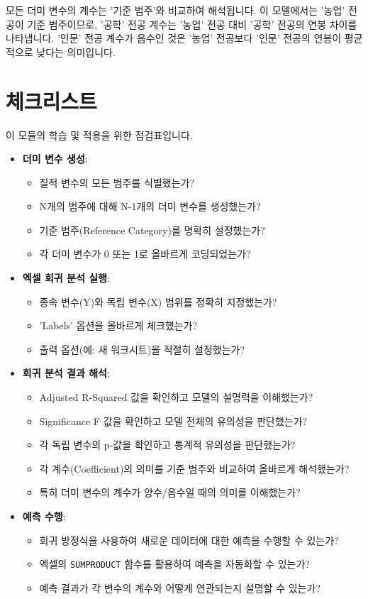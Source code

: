 \documentclass[11pt,a4paper]{book}
\theoremstyle{definition}
\begin{document}
\begin{tcolorbox}[warning={중요: 기준 범주와의 비교}]
모든 더미 변수의 계수는 '기준 범주'와 비교하여 해석됩니다. 이 모델에서는 '농업' 전공이 기준 범주이므로, '공학' 전공 계수는 '농업' 전공 대비 '공학' 전공의 연봉 차이를 나타냅니다. '인문' 전공 계수가 음수인 것은 '농업' 전공보다 '인문' 전공의 연봉이 평균적으로 낮다는 의미입니다.
\end{tcolorbox}


\section{체크리스트}

이 모듈의 학습 및 적용을 위한 점검표입니다.

\begin{itemize}
    \item \textbf{더미 변수 생성}:
    \begin{itemize}
        \item 질적 변수의 모든 범주를 식별했는가?
        \item N개의 범주에 대해 N-1개의 더미 변수를 생성했는가?
        \item 기준 범주(Reference Category)를 명확히 설정했는가?
        \item 각 더미 변수가 0 또는 1로 올바르게 코딩되었는가?
    \end{itemize}
    \item \textbf{엑셀 회귀 분석 실행}:
    \begin{itemize}
        \item 종속 변수(Y)와 독립 변수(X) 범위를 정확히 지정했는가?
        \item 'Labels' 옵션을 올바르게 체크했는가?
        \item 출력 옵션(예: 새 워크시트)을 적절히 설정했는가?
    \end{itemize}
    \item \textbf{회귀 분석 결과 해석}:
    \begin{itemize}
        \item Adjusted R-Squared 값을 확인하고 모델의 설명력을 이해했는가?
        \item Significance F 값을 확인하고 모델 전체의 유의성을 판단했는가?
        \item 각 독립 변수의 p-값을 확인하고 통계적 유의성을 판단했는가?
        \item 각 계수(Coefficient)의 의미를 기준 범주와 비교하여 올바르게 해석했는가?
        \item 특히 더미 변수의 계수가 양수/음수일 때의 의미를 이해했는가?
    \end{itemize}
    \item \textbf{예측 수행}:
    \begin{itemize}
        \item 회귀 방정식을 사용하여 새로운 데이터에 대한 예측을 수행할 수 있는가?
        \item 엑셀의 \texttt{SUMPRODUCT} 함수를 활용하여 예측을 자동화할 수 있는가?
        \item 예측 결과가 각 변수의 계수와 어떻게 연관되는지 설명할 수 있는가?
    \end{itemize}
\end{itemize}
\end{document}

